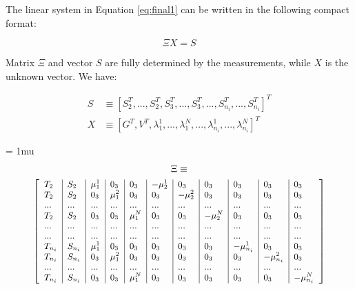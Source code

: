 \documentclass[letterpaper, 10 pt, conference]{ieeeconf}  %
\begin{document}
The linear system in Equation \ref{eq:final1} can be written in the following compact format:

\begin{equation}
\label{eq:mat1}
\Xi X = S
\end{equation}

\noindent Matrix $\Xi$ and vector $S$ are fully determined by the measurements, while $X$ is the unknown vector.
We have:

\begin{equation*}
  \begin{aligned}
S &\equiv [S_2^T, ...,S_2^T, S_3^T,...,S_3^T,...,S_{n_i}^T,...,S_{n_i}^T]^T \\
X &\equiv [ G^T, V^T, \lambda_1^1, ..., \lambda_1^N, ..., \lambda_{n_i}^1, ..., \lambda_{n_i}^N]^T
  \end{aligned}
\end{equation*}
\vspace{-1cm}

{
\arraycolsep=3pt %
\medmuskip = 1mu %
\begin{multline*}
  \Xi \equiv \\
      {
        \footnotesize
        \left[
          \begin{array}{l|l|l|l|l|l|l|l|l|l|l}
            T_2 & S_2 & \mu_1^1 & 0_3 & 0_3 & -\mu_2^1 & 0_3 & 0_3 & 0_3 & 0_3 & 0_3 \\
            T_2 & S_2 & 0_3 & \mu_1^2 & 0_3 & 0_3 & -\mu_2^2 & 0_3 & 0_3 & 0_3 & 0_3 \\
            ... & ... & ... & ... & ... & ... & ... & ... & ... & ... & ... \\
            T_2 & S_2 & 0_3 & 0_3 & \mu_1^N & 0_3 & 0_3 & -\mu_2^N & 0_3 & 0_3 & 0_3 \\
            ... & ... & ... & ... & ... & ... & ... & ... & ... & ... & ... \\
            ... & ... & ... & ... & ... & ... & ... & ... & ... & ... & ... \\
            T_{n_i} & S_{n_i} & \mu_1^1 & 0_3 & 0_3 & 0_3 & 0_3 & 0_3 & -\mu_{n_i}^1 & 0_3 & 0_3 \\
            T_{n_i} & S_{n_i} & 0_3 & \mu_1^2 & 0_3 & 0_3 & 0_3 & 0_3 & 0_3 & -\mu_{n_i}^2 & 0_3 \\
            ... & ... & ... & ... & ... & ... & ... & ... & ... & ... & ... \\
            T_{n_i} & S_{n_i} & 0_3 & 0_3 & \mu_1^N & 0_3 & 0_3 & 0_3 & 0_3 & 0_3 & -\mu_{n_i}^N
          \end{array}
          \right]
      }
\end{multline*}
}
\end{document}
